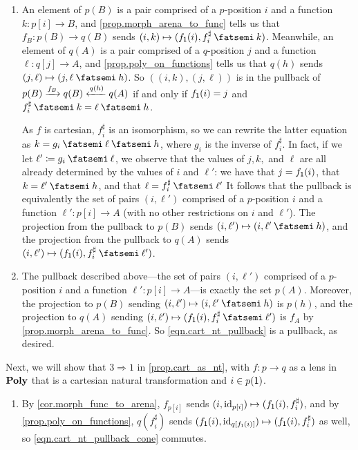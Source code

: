 \documentclass[Book-Poly]{subfiles}
\begin{document}
\begin{exercise}
\begin{solution}
\begin{enumerate}
    \item An element of $p(B)$ is a pair comprised of a $p$-position $i$ and a function $k\colon p[i]\to B$, and \cref{prop.morph_arena_to_func} tells us that $f_B\colon p(B)\to q(B)$ sends $(i,k)\mapsto(f_\1(i),f^\sharp_i\then k)$.
    Meanwhile, an element of $q(A)$ is a pair comprised of a $q$-position $j$ and a function $\ell\colon q[j]\to A$, and \cref{prop.poly_on_functions} tells us that $q(h)$ sends $(j,\ell)\mapsto(j,\ell\then h)$.
    So $((i,k),(j,\ell))$ is in the pullback of $p(B)\xrightarrow{f_B}q(B)\xleftarrow{q(h)}q(A)$ if and only if $f_{\textsf{1}}(i)=j$ and $f^\sharp_i\then k=\ell\then h$.

    As $f$ is cartesian, $f^\sharp_i$ is an isomorphism, so we can rewrite the latter equation as $k=g_i\then\ell\then h$, where $g_i$ is the inverse of $f^\sharp_i$.
    In fact, if we let $\ell'\coloneqq g_i\then\ell$, we observe that the values of $j,k,$ and $\ell$ are all already determined by the values of $i$ and $\ell'$: we have that $j=f_{\textsf{1}}(i)$, that $k=\ell'\then h$, and that $\ell=f^\sharp_i\then\ell'$
    It follows that the pullback is equivalently the set of pairs $(i,\ell')$ comprised of a $p$-position $i$ and a function $\ell'\colon p[i]\to A$ (with no other restrictions on $i$ and $\ell'$).
    The projection from the pullback to $p(B)$ sends $(i,\ell')\mapsto(i,\ell'\then h)$, and the projection from the pullback to $q(A)$ sends $(i,\ell')\mapsto(f_\1(i),f^\sharp_i\then\ell')$.
    \item The pullback described above---the set of pairs $(i,\ell')$ comprised of a $p$-position $i$ and a function $\ell'\colon p[i]\to A$---is exactly the set $p(A)$.
    Moreover, the projection to $p(B)$ sending $(i,\ell')\mapsto(i,\ell'\then h)$ is $p(h)$, and the projection to $q(A)$ sending $(i,\ell')\mapsto(f_\1(i),f^\sharp_i\then\ell')$ is $f_A$ by \cref{prop.morph_arena_to_func}.
    So \eqref{eqn.cart_nt_pullback} is a pullback, as desired.
\end{enumerate}
Next, we will show that $3\Rightarrow1$ in \cref{prop.cart_as_nt}, with $f\colon p\to q$ as a lens in $\mathbf{Poly}$ that is a cartesian natural transformation and $i\in p(\textsf{1})$.
\begin{enumerate}[resume]
    \item By \cref{cor.morph_func_to_arena}, $f_{p[i]}$ sends $(i,\mathrm{id}_{p[i]})\mapsto(f_{\textsf{1}}(i),f^\sharp_i)$, and by \cref{prop.poly_on_functions}, $q(f^\sharp_i)$ sends $(f_{\textsf{1}}(i),\mathrm{id}_{q[f_{\textsf{1}}(i)]})\mapsto(f_{\textsf{1}}(i),f^\sharp_i)$ as well, so \eqref{eqn.cart_nt_pullback_cone} commutes.


\end{enumerate}
\end{solution}
\end{exercise}
\end{document}
